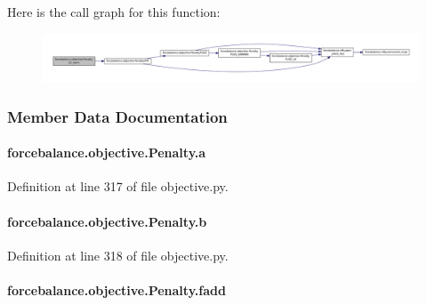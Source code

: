 Here is the call graph for this function\-:\nopagebreak
\begin{figure}[H]
\begin{center}
\leavevmode
\includegraphics[width=350pt]{classforcebalance_1_1objective_1_1Penalty_ab59d5beafbab0918b7c3e0c61ece41a3_cgraph}
\end{center}
\end{figure}




\subsubsection{Member Data Documentation}
\hypertarget{classforcebalance_1_1objective_1_1Penalty_abab984da8a8f62adbd1decbaf56ac2fa}{
\paragraph[{a}]{\setlength{\rightskip}{0pt plus 5cm}forcebalance.\-objective.\-Penalty.\-a}}\label{classforcebalance_1_1objective_1_1Penalty_abab984da8a8f62adbd1decbaf56ac2fa}


Definition at line 317 of file objective.\-py.

\hypertarget{classforcebalance_1_1objective_1_1Penalty_a0d9da5669d74dfd54a2fc639424e37b6}{
\paragraph[{b}]{\setlength{\rightskip}{0pt plus 5cm}forcebalance.\-objective.\-Penalty.\-b}}\label{classforcebalance_1_1objective_1_1Penalty_a0d9da5669d74dfd54a2fc639424e37b6}


Definition at line 318 of file objective.\-py.

\hypertarget{classforcebalance_1_1objective_1_1Penalty_a8c93cd0cfa455a54f957a061b5f7ac50}{
\paragraph[{fadd}]{\setlength{\rightskip}{0pt plus 5cm}forcebalance.\-objective.\-Penalty.\-fadd}}\label{classforcebalance_1_1objective_1_1Penalty_a8c93cd0cfa455a54f957a061b5f7ac50}


